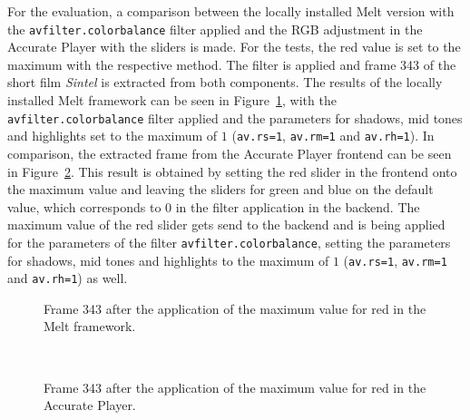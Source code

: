 \documentclass[../MasterThesis.tex]{subfiles}
\begin{document}
For the evaluation, a comparison between the locally installed Melt version with the \texttt{avfilter.colorbalance} filter applied and the RGB adjustment in the Accurate Player with the sliders is made.
For the tests, the red value is set to the maximum with the respective method.
The filter is applied and frame 343 of the short film \textit{Sintel} is extracted from both components. The results of the locally installed Melt framework can be seen in Figure~\ref{figure:redMelt}, with the \texttt{avfilter.colorbalance} filter applied and the parameters for shadows, mid tones and highlights set to the maximum of $1$ (\texttt{av.rs=1}, \texttt{av.rm=1} and \texttt{av.rh=1}).
In comparison, the extracted frame from the Accurate Player frontend can be seen in Figure~\ref{figure:redAP}. This result is obtained by setting the red slider in the frontend onto the maximum value and leaving the sliders for green and blue on the default value, which corresponds to $0$ in the filter application in the backend. The maximum value of the red slider gets send to the backend and is being applied for the parameters of the filter \texttt{avfilter.colorbalance}, setting the parameters for shadows, mid tones and highlights to the maximum of $1$ (\texttt{av.rs=1}, \texttt{av.rm=1} and \texttt{av.rh=1}) as well.



\begin{minipage}{0.48\textwidth}
	
	\begin{figure}[H]
		\begin{center}
			\caption[Frame 343 after the application of the red filter in the Melt framework.]{Frame 343 after the application of the maximum value for red in the Melt framework.}
			\label{figure:redMelt}
		\end{center}
	\end{figure}
\end{minipage}\begin{minipage}{0.04\textwidth}
	\ 
\end{minipage}\begin{minipage}{0.48\textwidth}
	
	\begin{figure}[H]
		\begin{center}
			\caption[Frame 343 after the application of the red filter in the Accurate Player.]{Frame 343 after the application of the maximum value for red in the Accurate Player.}
			\label{figure:redAP}
		\end{center}
	\end{figure}
\end{minipage}
\end{document}
